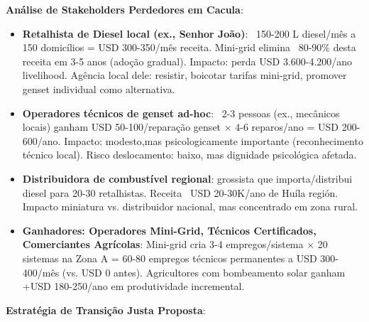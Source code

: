 \documentclass[12pt, a4paper]{article}
\begin{document}
\textbf{Análise de Stakeholders Perdedores em Cacula}:
\begin{itemize}
\item \textbf{Retalhista de Diesel local (ex., Senhor João)}: ~150-200 L diesel/mês a 150 domicílios = USD 300-350/mês receita. Mini-grid elimina ~80-90\% desta receita em 3-5 anos (adoção gradual). Impacto: perda USD 3.600-4.200/ano livelihood. Agência local dele: resistir, boicotar tarifas mini-grid, promover genset individual como alternativa.

\item \textbf{Operadores técnicos de genset ad-hoc}: ~2-3 pessoas (ex., mecânicos locais) ganham USD 50-100/reparação genset × 4-6 reparos/ano = USD 200-600/ano. Impacto: modesto,mas psicologicamente importante (reconhecimento técnico local). Risco deslocamento: baixo, mas dignidade psicológica afetada.

\item \textbf{Distribuidora de combustível regional}: grossista que importa/distribui diesel para 20-30 retalhistas. Receita ~USD 20-30K/ano de Huíla región. Impacto miniatura vs. distribuidor nacional, mas concentrado em zona rural.

\item \textbf{Ganhadores: Operadores Mini-Grid, Técnicos Certificados, Comerciantes Agrícolas}: Mini-grid cria 3-4 empregos/sistema × 20 sistemas na Zona A = 60-80 empregos técnicos permanentes a USD 300-400/mês (vs. USD 0 antes). Agricultores com bombeamento solar ganham +USD 180-250/ano em produtividade incremental.
\end{itemize}

\textbf{Estratégia de Transição Justa Proposta}:
\end{document}
